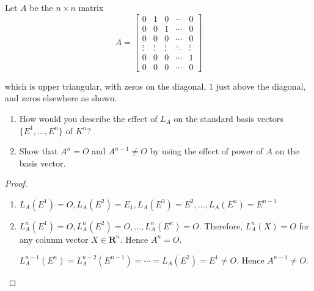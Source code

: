 \begin{exercise}
    Let $A$ be the $n\times n$ matrix
    \[
        A = \begin{bmatrix}
            0      & 1      & 0      & \cdots & 0      \\
            0      & 0      & 1      & \cdots & 0      \\
            0      & 0      & 0      & \cdots & 0      \\
            \vdots & \vdots & \vdots & \ddots & \vdots \\
            0      & 0      & 0      & \cdots & 1      \\
            0      & 0      & 0      & \cdots & 0
        \end{bmatrix}
    \]

    which is upper triangular, with zeros on the diagonal, $1$ just above the diagonal, and zeros elsewhere as shown.
    \begin{enumerate}[label={(\alph*)}]
        \item How would you describe the effect of $L_{A}$ on the standard basis vectors $\{ E^{1}, \ldots, E^{n} \}$ of $K^{n}$?
        \item Show that $A^{n} = O$ and $A^{n-1}\ne O$ by using the effect of power of $A$ on the basis vector.
    \end{enumerate}
\end{exercise}

\begin{proof}
    \begin{enumerate}[label={(\alph*)}]
        \item $L_{A}(E^{1}) = O, L_{A}(E^{2}) = E_{1}, L_{A}(E^{3}) = E^{2}, \ldots, L_{A}(E^{n}) = E^{n-1}$
        \item $L_{A}^{n}(E^{1}) = O, L_{A}^{n}(E^{2}) = O, \ldots, L_{A}^{n}(E^{n}) = O$. Therefore, $L_{A}^{n}(X) = O$ for any column vector $X\in\mathbf{R}^{n}$. Hence $A^{n} = O$.

              $L_{A}^{n-1}(E^{n}) = L_{A}^{n-2}(E^{n-1}) = \cdots = L_{A}(E^{2}) = E^{1}\ne O$. Hence $A^{n-1} \ne O$.
    \end{enumerate}
\end{proof}
